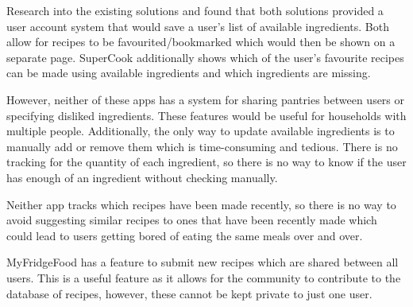 \documentclass[../CHEFCookingHelperForEveryonesFridge.tex]{subfiles}
\renewcommand{\cite}[1]{\parencite{#1}}
\begin{document}
Research into the existing solutions \cite{myfridgefood_myfridgefood_nodate} and \cite{supercook_supercook_nodate} found that both solutions provided a user account system
that would save a user's list of available ingredients. Both allow for recipes to be favourited/bookmarked which would then be shown on a separate page.
SuperCook additionally shows which of the user's favourite recipes can be made using available ingredients and which ingredients are missing.

However, neither of these apps has a system for sharing pantries between users or specifying disliked ingredients. These features would be useful for households with multiple people.
Additionally, the only way to update available ingredients is to manually add or remove them which is time-consuming and tedious. There is no tracking for the quantity of
each ingredient, so there is no way to know if the user has enough of an ingredient without checking manually.

Neither app tracks which recipes have been made recently, so there is no way to avoid suggesting similar recipes to ones that have been recently made which could lead to
users getting bored of eating the same meals over and over.

MyFridgeFood has a feature to submit new recipes which are shared between all users. This is a useful feature as it allows for the community to contribute to the database
of recipes, however, these cannot be kept private to just one user.
\end{document}
